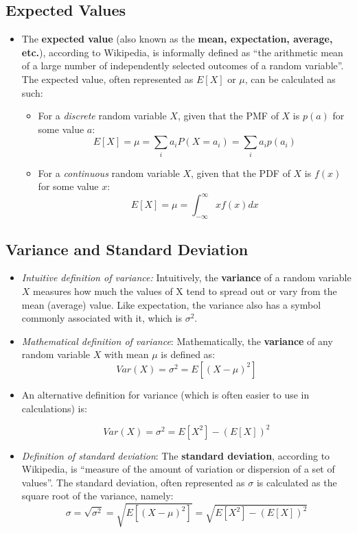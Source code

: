 \documentclass[12pt]{article}
\begin{document}
\subsection{Expected Values}
\begin{itemize}
	\item The \textbf{expected value} (also known as the \textbf{mean, expectation,
		      average, etc.}), according to Wikipedia, is informally
	      defined as ``the arithmetic mean of a large number of independently selected
	      outcomes of a random variable''. The expected value, often represented as $E[X]$ or $\mu$,
	      can be calculated as such:
	      \begin{itemize}
		      \item For a \textit{discrete} random variable $X$, given that the PMF of $X$ is $p(a)$ for some value $a$:
		            \[
			            E[X] = \mu = \displaystyle\sum_{i} a_i P(X=a_i) = \displaystyle\sum_{i} a_i p(a_i)
		            \]
              \item For a \textit{continuous} random variable $X$, given that
                  the PDF of $X$ is $f(x)$ for some value $x$:
		            \[
			            E[X] = \mu = \int_{-\infty}^{\infty}x f(x) dx
		            \]
	      \end{itemize}
\end{itemize}


\subsection{Variance and Standard Deviation}
\begin{itemize}
	\item \textit{Intuitive definition of variance:} Intuitively, the \textbf{variance} of a random variable $X$ measures how much
	      the values of X tend to spread out or vary from the mean (average) value. Like
	      expectation, the variance also has a symbol commonly associated with it, which is $\sigma^2$.
	\item \textit{Mathematical definition of variance}: Mathematically, the \textbf{variance} of any random variable $X$ with mean $\mu$
	      is defined as:
	      \[
		      Var(X) = \sigma^2 = E[(X-\mu)^2]
	      \]
	\item  An alternative definition for variance (which is often easier to use in calculations) is:

	      \[
		      Var(X) = \sigma^2 = E[X^2] - (E[X])^2
	      \]
	\item \textit{Definition of standard deviation}: The \textbf{standard
		      deviation}, according to Wikipedia, is ``measure of the amount of
	      variation or dispersion of a set of values''. The standard deviation,
	      often represented as $\sigma$ is calculated as the square root of the
	      variance, namely:
	      \[
		      \sigma = \sqrt{\sigma^2} = \sqrt{E[(X-\mu)^2]} = \sqrt{E[X^2] - (E[X])^2}
	      \]
\end{itemize}
\end{document}
